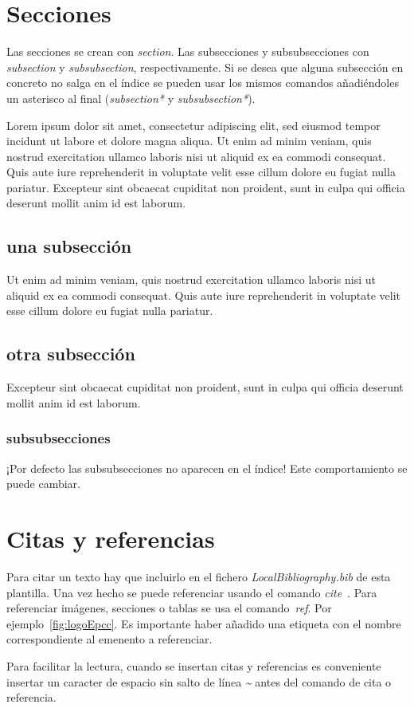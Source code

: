 \documentclass[12pt,a4paper,twoside]{book}
\begin{document}
\section{Secciones}
Las secciones se crean con \textit{section}. Las subsecciones y subsubsecciones con \textit{subsection} y \textit{subsubsection}, respectivamente. Si se desea que alguna subsección en concreto no salga en el índice se pueden usar los mismos comandos añadiéndoles un asterisco al final (\textit{subsection*} y \textit{subsubsection*}).
\par
Lorem ipsum dolor sit amet, consectetur adipiscing elit, sed eiusmod tempor incidunt ut labore et dolore magna aliqua. Ut enim ad minim veniam, quis nostrud exercitation ullamco laboris nisi ut aliquid ex ea commodi consequat. Quis aute iure reprehenderit in voluptate velit esse cillum dolore eu fugiat nulla pariatur. Excepteur sint obcaecat cupiditat non proident, sunt in culpa qui officia deserunt mollit anim id est laborum.
\subsection{una subsección}
Ut enim ad minim veniam, quis nostrud exercitation ullamco laboris nisi ut aliquid ex ea commodi consequat. Quis aute iure reprehenderit in voluptate velit esse cillum dolore eu fugiat nulla pariatur.
\subsection{otra subsección}
Excepteur sint obcaecat cupiditat non proident, sunt in culpa qui officia deserunt mollit anim id est laborum.
\subsubsection{subsubsecciones}
¡Por defecto las subsubsecciones no aparecen en el índice! Este comportamiento se puede cambiar.

\section{Citas y referencias}
Para citar un texto hay que incluirlo en el fichero \textit{LocalBibliography.bib} de esta plantilla. Una vez hecho se puede referenciar usando el comando \textit{cite}~\cite{LaTeX_tutorials}.
Para referenciar imágenes, secciones o tablas se usa el comando~\textit{ref}. Por ejemplo~\ref{fig:logoEpcc}. Es importante haber añadido una etiqueta con el nombre correspondiente al emenento a referenciar.
\par
Para facilitar la lectura, cuando se insertan citas y referencias es conveniente insertar un caracter de espacio sin salto de línea \textit{\~} antes del comando de cita o referencia.
\end{document}
